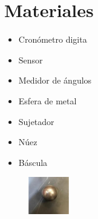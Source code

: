 \section{Materiales}
\begin{minipage}{0.8\linewidth}
    \begin{multicols}{2}
    \begin{itemize}
        \item Cronómetro digita
        \item Sensor
        \item Medidor de ángulos
        \item Esfera de metal
        \item Sujetador
        \item Núez
        \item Báscula
    \end{itemize}
\end{multicols}
\end{minipage}
\begin{minipage}{0.2\linewidth}
    \begin{figure}[H]
        \centering
        \includegraphics[scale=0.8]{Images/ima1.png}
        \label{fig:ima1}
    \end{figure}
\end{minipage}
